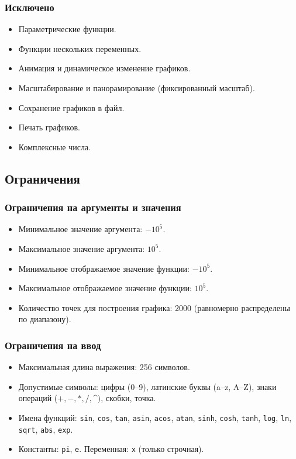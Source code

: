 \documentclass[a4paper, final]{article}
\begin{document}
\subsubsection*{Исключено}

\begin{itemize}
    \item Параметрические функции.
    \item Функции нескольких переменных.
    \item Анимация и динамическое изменение графиков.
    \item Масштабирование и панорамирование (фиксированный масштаб).
    \item Сохранение графиков в файл.
    \item Печать графиков.
    \item Комплексные числа.
\end{itemize}

\subsection{Ограничения}

\subsubsection*{Ограничения на аргументы и значения}

\begin{itemize}
    \item Минимальное значение аргумента: $-10^5$.
    \item Максимальное значение аргумента: $10^5$.
    \item Минимальное отображаемое значение функции: $-10^5$.
    \item Максимальное отображаемое значение функции: $10^5$.
    \item Количество точек для построения графика: 2000 (равномерно
          распределены по диапазону).
\end{itemize}

\subsubsection*{Ограничения на ввод}

\begin{itemize}
    \item Максимальная длина выражения: 256 символов.
    \item Допустимые символы: цифры (0--9), латинские буквы (a--z, A--Z),
          знаки операций ($+, -, *, /, $\^{}$)$, скобки, точка.
    \item Имена функций: \texttt{sin}, \texttt{cos}, \texttt{tan},
          \texttt{asin}, \texttt{acos}, \texttt{atan},
          \texttt{sinh}, \texttt{cosh}, \texttt{tanh},
          \texttt{log}, \texttt{ln}, \texttt{sqrt}, \texttt{abs},
          \texttt{exp}.
    \item Константы: \texttt{pi}, \texttt{e}. Переменная: \texttt{x}
          (только строчная).
\end{itemize}
\end{document}
